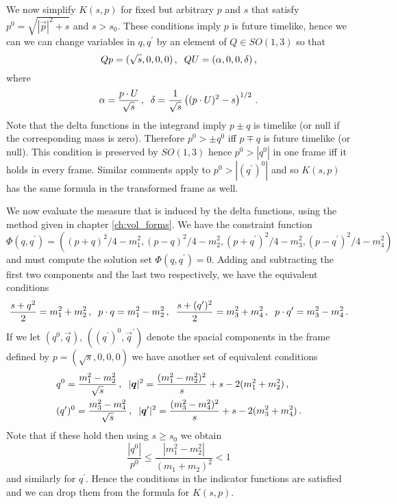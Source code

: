 We now simplify $K(s,p)$ for fixed but arbitrary $p$ and $s$ that satisfy $p^0=\sqrt{|\vec p|^2+s}$ and $s>s_0$.  These conditions imply $p$ is future timelike, hence we can we can change variables in  $q,q^{\prime}$ by an element of $Q\in SO(1,3)$ so that 
\begin{equation}
Qp=(\sqrt{s},0,0,0)\,, \hspace{2mm} QU=(\alpha,0,0,\delta)\,,
\end{equation}
where
\begin{equation}
\alpha=\frac{p\cdot U}{\sqrt{s}}\,, \hspace{2mm} \delta=\frac{1}{\sqrt{s}}\left((p\cdot U)^2-s \right)^{1/2}\,.
\end{equation}
Note that the delta functions in the integrand imply $p\pm q$ is  timelike (or null if the corresponding mass is zero).  Therefore $p^0>\pm q^0$ iff $p\mp q$ is future timelike (or null).  This condition is preserved by $SO(1,3)$ hence $p^0>|q^0|$ in one frame iff it holds in every frame.  Similar comments apply to $p^0>|(q^{\prime})^0|$ and so $K(s,p)$ has the same formula in the transformed frame as well.

We now evaluate the measure that is induced by the delta functions, using the method given in chapter \ref{ch:vol_forms}.  We have the constraint function
\begin{equation}
\Phi(q,q^{\prime})=((p+q)^2/4-m_1^2,(p-q)^2/4-m_2^2,(p+q^{\prime})^2/4-m_3^2,(p-q^{\prime})^2/4-m_4^2)
\end{equation}
and must compute the solution set $\Phi(q,q^{\prime})=0$. Adding and subtracting the first two components and the last two respectively, we have the equivalent conditions
\begin{align}
\frac{s+q^2}{2}=m_1^2+m_2^2\,,\hspace{2mm} p\cdot q=m_1^2-m_2^2\,, \hspace{2mm}\frac{s+(q^{\prime})^2}{2}=m_3^2+m_4^2\,,\hspace{2mm} p\cdot q^{\prime}=m_3^2-m_4^2\,.
\end{align}
If we let $(q^0,\vec{q})$, $((q^{\prime})^0,\vec{q}^{\prime})$ denote the spacial components in the frame defined by $p=(\sqrt{s},0,0,0)$ we have another set of equivalent conditions
\begin{align}\label{coord_conditions}
&q^{0}=\frac{m_1^2-m_2^2}{\sqrt{s}}\,,\hspace{2mm} |\vec{q}|^2=\frac{(m_1^2-m_2^2)^2}{s}+s-2(m_1^2+m_2^2)\,,\\
&(q^{\prime})^{0}=\frac{m_3^2-m_4^2}{\sqrt{s}}\,, \hspace{2mm} |\vec{q}^{\prime}|^2=\frac{(m_3^2-m_4^2)^2}{s}+s-2(m_3^2+m_4^2)\,.\notag
\end{align}
Note that if these hold then using $s\geq s_0$ we obtain
\begin{equation}
\frac{|q^0|}{p^0}\leq \frac{|m_1^2-m_2^2|}{(m_1+m_2)^2}<1
\end{equation}
and similarly for $q^{\prime}$.  Hence the conditions in the indicator functions are satisfied and we can drop them from the formula for $K(s,p)$.

